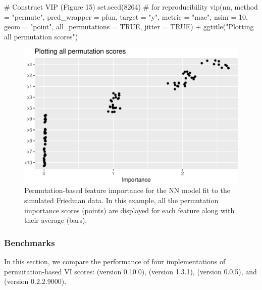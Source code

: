 \begin{Schunk}
\begin{Sinput}
# Construct VIP (Figure 15)
set.seed(8264)  # for reproducibility
vip(nn, method = "permute", pred_wrapper = pfun, target = "y", metric = "mae",
    nsim = 10, geom = "point", all_permutations = TRUE, jitter = TRUE) +
  ggtitle("Plotting all permutation scores")
\end{Sinput}
\begin{figure}[!htb]

{\centering \includegraphics[width=0.7\linewidth]{greenwell-boehmke_files/figure-latex/vip-nn-mae-all-1}

}

\caption[Permutation-based feature importance for the NN model fit to the simulated Friedman data]{Permutation-based feature importance for the NN model fit to the simulated Friedman data. In this example, all the permutation importance scores (points) are displayed for each feature along with their average (bars).}\label{fig:vip-nn-mae-all}
\end{figure}
\end{Schunk}

\subsubsection{Benchmarks}

In this section, we compare the performance of four implementations of
permutation-based VI scores:  (version 0.10.0),
 (version 1.3.1),
\newline {} (version 0.0.5), and
 (version 0.2.2.9000).

